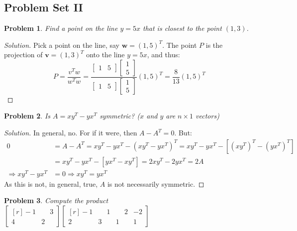 \documentclass[oneside]{book}
\theoremstyle{mystyle}
\newtheorem{problem}{Problem}[section]
\begin{document}
\subsection{Problem Set II}
\begin{problem}
Find a point on the line $y=5x$ that is closest to the point $(1,3)$.
\end{problem}
\begin{proof}[Solution]
Pick a point on the line, say $\mathbf{w} = (1,5)^T$. The point $P$ is the projection of $\mathbf{v} = (1,3)^T$ onto the line $y=5x$, and thus:
\begin{equation*}
    P = \frac{v^T w}{w^T w} = \frac{\begin{bmatrix}1 & 5 \end{bmatrix}\begin{bmatrix}1 \\ 5\end{bmatrix}}{\begin{bmatrix}1 & 5 \end{bmatrix}\begin{bmatrix}1 \\ 5\end{bmatrix}}(1,5)^T = \frac{8}{13}(1,5)^T
\end{equation*}
\end{proof}
\begin{problem}
Is $A = xy^T - yx^T$ symmetric? ($x$ and $y$ are $n\times 1$ vectors)
\end{problem}
\begin{proof}[Solution]
In general, no. For if it were, then $A-A^T = 0$. But:
\begin{align*}
    0&=A-A^T=xy^{T}-yx^{T}-(xy^{T}-yx^{T})^{T}=xy^{T}-yx^{T}-[(xy^{T})^{T}-(yx^{T})^{T}]\\
    &=xy^T - yx^T - [yx^T - xy^T]=2xy^T-2yx^T=2A\\
    \Rightarrow xy^{T}-yx^{T}&=0\Rightarrow xy^{T}=yx^{T} 
\end{align*}
As this is not, in general, true, $A$ is not necessarily symmetric.
\end{proof}
\begin{problem}
Compute the product $\begin{bmatrix*}[r] -1 & \phantom{-}3 \\ 4 & 2 \end{bmatrix*} \begin{bmatrix*}[r] -1 & \phantom{-}1 & \phantom{-}2 & -2 \\ 2 & 3 & 1 & 1 \end{bmatrix*}$
\end{problem}
\end{document}

